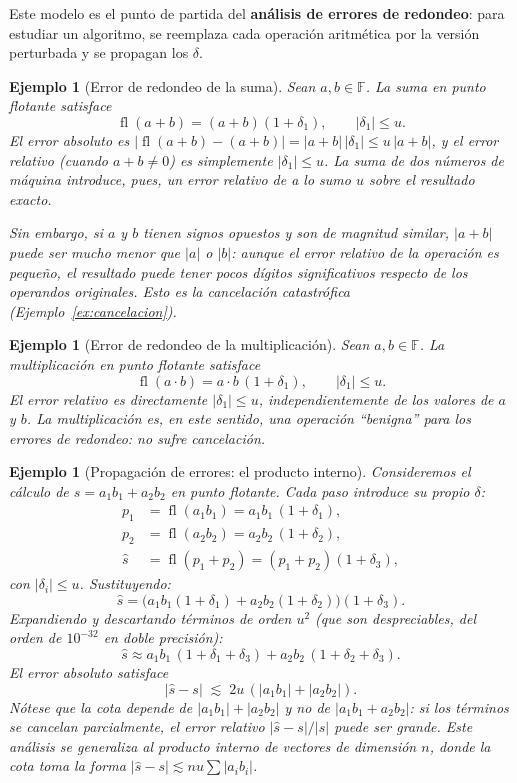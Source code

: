 \documentclass[a4paper,11pt]{report}
\newtheorem{example}[theorem]{Ejemplo}
\begin{document}
Este modelo es el punto de partida del \textbf{análisis de errores de redondeo}: para estudiar un algoritmo, se reemplaza cada operación aritmética por la versión perturbada y se propagan los $\delta$.

\begin{example}[Error de redondeo de la suma]\label{ex:error_suma}
Sean $a,b\in\mathbb{F}$.  La suma en punto flotante satisface
\[
\operatorname{fl}(a+b) = (a+b)(1+\delta_1), \qquad |\delta_1|\le u.
\]
El error absoluto es $|\operatorname{fl}(a+b)-(a+b)| = |a+b|\,|\delta_1| \le u\,|a+b|$, y el error relativo (cuando $a+b\neq 0$) es simplemente $|\delta_1|\le u$.  La suma de dos números de máquina introduce, pues, un error relativo de a lo sumo $u$ \emph{sobre el resultado exacto}.

Sin embargo, si $a$ y $b$ tienen signos opuestos y son de magnitud similar, $|a+b|$ puede ser mucho menor que $|a|$ o $|b|$: aunque el error relativo \emph{de la operación} es pequeño, el resultado puede tener pocos dígitos significativos respecto de los operandos originales.  Esto es la cancelación catastrófica (Ejemplo~\ref{ex:cancelacion}).
\end{example}

\begin{example}[Error de redondeo de la multiplicación]\label{ex:error_mult}
Sean $a,b\in\mathbb{F}$.  La multiplicación en punto flotante satisface
\[
\operatorname{fl}(a\cdot b) = a\cdot b\,(1+\delta_1), \qquad |\delta_1|\le u.
\]
El error relativo es directamente $|\delta_1|\le u$, independientemente de los valores de $a$ y $b$.  La multiplicación es, en este sentido, una operación ``benigna'' para los errores de redondeo: no sufre cancelación.
\end{example}

\begin{example}[Propagación de errores: el producto interno]\label{ex:error_producto_interno}
Consideremos el cálculo de $s = a_1 b_1 + a_2 b_2$ en punto flotante.  Cada paso introduce su propio $\delta$:
\begin{align*}
p_1 &= \operatorname{fl}(a_1 b_1) = a_1 b_1\,(1+\delta_1), \\
p_2 &= \operatorname{fl}(a_2 b_2) = a_2 b_2\,(1+\delta_2), \\
\hat{s} &= \operatorname{fl}(p_1 + p_2) = (p_1+p_2)(1+\delta_3),
\end{align*}
con $|\delta_i|\le u$.  Sustituyendo:
\[
\hat{s} = \bigl(a_1 b_1(1+\delta_1) + a_2 b_2(1+\delta_2)\bigr)(1+\delta_3).
\]
Expandiendo y descartando términos de orden $u^2$ (que son despreciables, del orden de $10^{-32}$ en doble precisión):
\[
\hat{s} \approx a_1 b_1\,(1+\delta_1+\delta_3) + a_2 b_2\,(1+\delta_2+\delta_3).
\]
El error absoluto satisface
\[
|\hat{s} - s| \;\lesssim\; 2u\,(|a_1 b_1| + |a_2 b_2|).
\]
Nótese que la cota depende de $|a_1 b_1|+|a_2 b_2|$ y no de $|a_1 b_1 + a_2 b_2|$: si los términos se cancelan parcialmente, el error relativo $|\hat{s}-s|/|s|$ puede ser grande.  Este análisis se generaliza al producto interno de vectores de dimensión $n$, donde la cota toma la forma $|\hat{s}-s|\lesssim nu\sum|a_i b_i|$.
\end{example}
\end{document}
